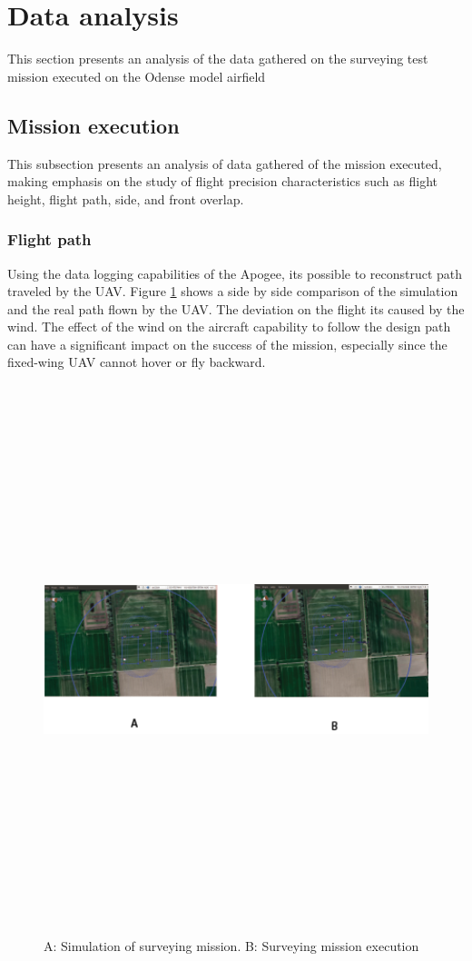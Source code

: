 \section{Data analysis}
This section presents an analysis of the data gathered on the surveying test mission executed on the Odense model airfield
\subsection{Mission execution}
This subsection presents an analysis of data gathered of the mission executed, making emphasis on the study of flight precision characteristics such as flight height, flight path, side, and front overlap. 
\subsubsection{Flight path}
Using the data logging capabilities of the Apogee, its possible to reconstruct path traveled by the UAV.
Figure \ref{fig:SimVReal} shows a side by side comparison of the simulation and the real path flown by the UAV. The deviation on the flight its caused by the wind. The effect of the wind on the aircraft capability to follow the design path can have a significant impact on the success of the mission, especially since the fixed-wing UAV cannot hover or fly backward. 
\begin{figure}[H]
\centering
\includegraphics[width=16cm,height=16cm,keepaspectratio]{imagenes/SimVsreallity.png}
\caption{ A: Simulation of surveying mission. B: Surveying mission execution}
\label{fig:SimVReal}
\end{figure}
